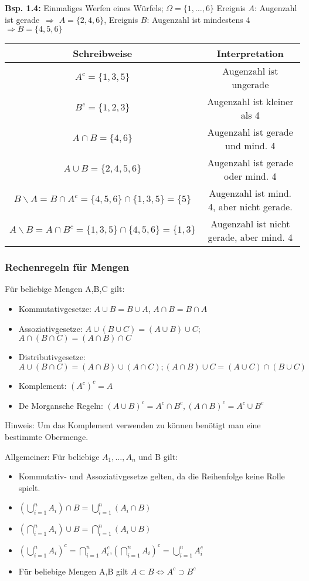\documentclass[a4paper,11pt]{article}
\begin{document}
\vspace{6pt}
\noindent\textbf{Bsp. 1.4:} Einmaliges Werfen eines Würfels; $\Omega = \{1,\dots,6\}$
\newline Ereignis $A$: \glqq Augenzahl ist gerade\grqq\ $\Rightarrow$ $A=\{2,4,6\}$, Ereignis $B$: \glqq Augenzahl ist mindestens 4\grqq\ $\Rightarrow B=\{4,5,6\}$
\newline\noindent\begin{tabular}{c|c}
Schreibweise & Interpretation\\
\hline
$A^c = \{1,3,5\}$ & Augenzahl ist ungerade\\
$B^c = \{1,2,3\}$ & Augenzahl ist kleiner als 4\\
$A\cap B = \{4,6\}$ & Augenzahl ist gerade und mind. 4\\
$A\cup B = \{2,4,5,6\}$ & Augenzahl ist gerade oder mind. 4\\
$B\backslash A = B\cap A^c = \{4,5,6\}\cap\{1,3,5\}=\{5\}$ & Augenzahl ist mind. 4, aber nicht gerade.\\
$A\backslash B = A\cap B^c = \{1,3,5\}\cap\{4,5,6\}=\{1,3\}$ & Augenzahl ist nicht gerade, aber mind. 4\\
\end{tabular}

\subsubsection{Rechenregeln für Mengen}
\noindent Für beliebige Mengen A,B,C gilt:
\begin{itemize}
    \item Kommutativgesetze: $A\cup B = B\cup A$, $A\cap B = B\cap A$
    \item Assoziativgesetze: $A\cup(B\cup C)=(A\cup B)\cup C$; $A\cap(B\cap C)=(A\cap B)\cap C$
    \item Distributivgesetze: $A\cup(B\cap C) = (A\cap B) \cup (A\cap C); (A\cap B)\cup C = (A\cup C)\cap (B\cup C)$
    \item Komplement: $(A^c)^c = A$
    \item De Morgansche Regeln: $(A\cup B)^c = A^c\cap B^c, (A\cap B)^c = A^c\cup B^c$
\end{itemize}
Hinweis: Um das Komplement verwenden zu können benötigt man eine bestimmte Obermenge.

\vspace{6pt}
\noindent Allgemeiner: Für beliebige $A_1,\dots,A_n$ und B gilt:
\begin{itemize}
    \item Kommutativ- und Assoziativgesetze gelten, da die Reihenfolge keine Rolle spielt.
    \item $(\bigcup_{i=1}^{n}A_i)\cap B = \bigcup_{i=1}^{n}(A_i\cap B)$
    \item $(\bigcap_{i=1}^{n}A_i)\cup B = \bigcap_{i=1}^{n}(A_i\cup B)$
    \item $(\bigcup_{i=1}^{n}A_i)^c = \bigcap_{i=1}^{n}A_i^c$,$(\bigcap_{i=1}^{n}A_i)^c = \bigcup_{i=1}^{n}A_i^c$
    \item Für beliebige Mengen A,B gilt $A\subset B \Leftrightarrow A^c\supset B^c$
\end{itemize}
\end{document}
